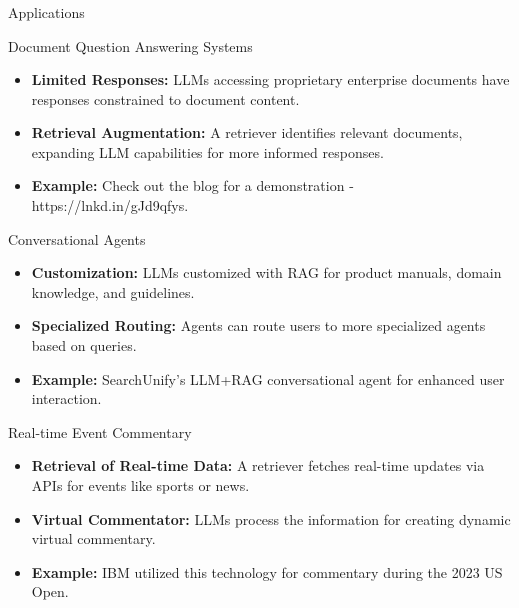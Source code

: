 \begin{frame}[fragile]\frametitle{}
\begin{center}
{\Large Applications}
\end{center}
\end{frame}

\begin{frame}[fragile]{Document Question Answering Systems}

\begin{itemize}
  \item \textbf{Limited Responses:} LLMs accessing proprietary enterprise documents have responses constrained to document content.
  
  \item \textbf{Retrieval Augmentation:} A retriever identifies relevant documents, expanding LLM capabilities for more informed responses.
  
  \item \textbf{Example:} Check out the blog for a demonstration - https://lnkd.in/gJd9qfys.
\end{itemize}

\end{frame}

\begin{frame}[fragile]{Conversational Agents}

\begin{itemize}
  \item \textbf{Customization:} LLMs customized with RAG for product manuals, domain knowledge, and guidelines.
  
  \item \textbf{Specialized Routing:} Agents can route users to more specialized agents based on queries.
  
  \item \textbf{Example:} SearchUnify's LLM+RAG conversational agent for enhanced user interaction.
\end{itemize}

\end{frame}

\begin{frame}[fragile]{Real-time Event Commentary}

\begin{itemize}
  \item \textbf{Retrieval of Real-time Data:} A retriever fetches real-time updates via APIs for events like sports or news.
  
  \item \textbf{Virtual Commentator:} LLMs process the information for creating dynamic virtual commentary.
  
  \item \textbf{Example:} IBM utilized this technology for commentary during the 2023 US Open.
\end{itemize}

\end{frame}

